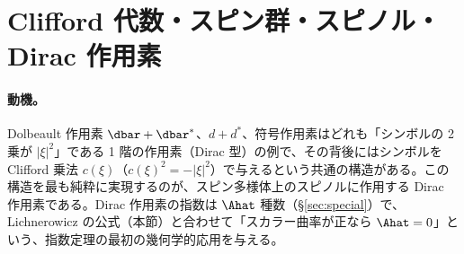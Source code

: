 
\section{Clifford 代数・スピン群・スピノル・Dirac 作用素}\label{sec:clifford}
\paragraph{動機。}Dolbeault 作用素 $\dbar+\dbar^*$、$d+d^*$、符号作用素はどれも「シンボルの 2 乗が $|\xi|^2$」である 1 階の作用素（Dirac 型）の例で、その背後にはシンボルを Clifford 乗法 $c(\xi)$（$c(\xi)^2=-|\xi|^2$）で与えるという共通の構造がある。この構造を最も純粋に実現するのが、スピン多様体上のスピノルに作用する Dirac 作用素である。Dirac 作用素の指数は $\Ahat$ 種数（\S\ref{sec:special}）で、Lichnerowicz の公式（本節）と合わせて「スカラー曲率が正なら $\Ahat=0$」という、指数定理の最初の幾何学的応用を与える。

